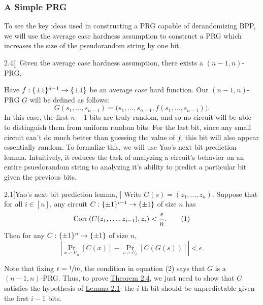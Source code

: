 \documentclass[11pt]{article}
\begin{document}
\subsubsection{A Simple PRG}

To see the key ideas used in constructing a PRG capable of derandomizing BPP, we will use the average case hardness assumption to construct a PRG which increases the size of the pseudorandom string by one bit.

\begin{theorem}{2.4}[\cite{NW94}]\label{t-2-4}
    Given the average case hardness assumption, there exists a $(n - 1, n)$-PRG.
\end{theorem}
\noindent
Have $f : \{\pm 1\}^{n - 1} \rightarrow \{\pm 1\}$ be an average case hard function. Our $(n - 1, n)$-PRG $G$ will be defined as follows:
\begin{equation*}
    G(s_1, \ldots, s_{n - 1}) = \bigl(s_1, \ldots, s_{n - 1}, f(s_1, \ldots, s_{n - 1})\bigr).
\end{equation*}
In this case, the first $n - 1$ bits are truly random, and so no circuit will be able to distinguish them from uniform random bits. For the last bit, since any small circuit can't do much better than guessing the value of $f$, this bit will also appear essentially random. To formalize this, we will use Yao's next bit prediction lemma. Intuitively, it reduces the task of analyzing a circuit's behavior on an entire psuedorandom string to analyzing it's ability to predict a particular bit given the previous bits.
\begin{lemma}{2.1}[Yao's next bit prediction lemma, \cite{Yao82}]\label{l-2-1}
    Write $G(s) = (z_1, \ldots, z_n)$. Suppose that for all $i \in [n]$, any circuit $C : \{\pm 1\}^{i - 1} \rightarrow \{\pm 1\}$ of size $n$ has 
    \begin{equation*}
        \mathrm{Corr}\left(C(z_1, \ldots, z_{i - 1}), z_i\right) < \frac{\epsilon}{n}. \tag{1}
    \end{equation*}
    Then for any $C : \{\pm 1\}^n \rightarrow \{\pm 1\}$ of size $n$, 
    \begin{equation*}
        \left|\Pr_{x \backsim U_n}[C(x)] - \Pr_{s \backsim U_\ell}[C(G(s))]\right| < \epsilon. \tag{2}
    \end{equation*}
\end{lemma}
Note that fixing $\epsilon = \sfrac{1}{10}$, the condition in equation (2) says that $G$ is a $(n - 1, n)$-PRG. Thus, to prove  \hyperref[t-2-4]{Theorem 2.4}, we just need to show that $G$ satisfies the hypothesis of \hyperref[l-2-1]{Lemma 2.1}: the $i$-th bit should be unpredictable given the first $i - 1$ bits.
\end{document}
